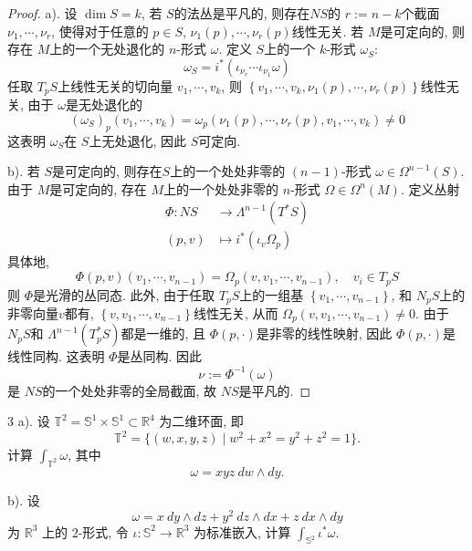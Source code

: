 \documentclass[../main.tex]{subfiles}
\begin{document}
\begin{proof}
a). 设 $\operatorname{dim}S= k$, 若 $S$的法丛是平凡的, 则存在$NS$的 $r:= n-k$个截面 $\nu _1 ,\cdots ,\nu _{r}$, 使得对于任意的 $p\in S$, $\nu _{1}\left(p\right),\cdots ,\nu _{r}\left(p\right)$线性无关.
若 $M$是可定向的, 则存在 $M$上的一个无处退化的 $n$-形式 $\omega$. 定义 $S$上的一个 $k$-形式 $\omega_{S}$:
 $$ \omega_{S}=i^{*}\left( \iota _{\nu _r } \cdots \iota _{\nu _{1}}\omega\right) $$
任取 $T_{p}S$上线性无关的切向量 $v_1,\cdots ,v_{k}$, 则 $\left\{ v_1,\cdots ,v_{k},\nu _1 \left(p\right),\cdots ,\nu _{r}\left(p\right) \right\}$线性无关, 由于 $\omega$是无处退化的
 $$ \left(\omega_{S}\right)_{p}\left(v_1,\cdots ,v_{k}\right)=\omega_{p}\left(\nu _1 \left(p\right),\cdots ,\nu _{r}\left(p\right),v_1,\cdots ,v_{k}\right)\neq 0  $$
这表明 $\omega_{S}$在 $S$上无处退化, 因此 $S$可定向.

b). 若 $S$是可定向的, 则存在$S$上的一个处处非零的 $\left(n-1\right)$-形式 $\omega\in \Omega^{n-1}\left(S\right)$. 由于 $M$是可定向的, 存在 $M$上的一个处处非零的 $n$-形式 $\Omega\in \Omega^{n}\left(M\right)$. 定义丛射
 $$ \begin{aligned} \Phi : NS&\to \Lambda^{n-1}\left(T^{*}S\right) \\ \left(p,v\right)&\mapsto  i^{*}\left(\iota _{v }\Omega_{p}\right)\end{aligned} $$
具体地,
 $$ \Phi \left(p,v \right)\left(v_1,\cdots ,v_{n-1}\right)=  \Omega_{p}\left(v,v_1,\cdots ,v_{n-1}\right),\quad v_{i}\in T_{p}S$$
则 $\Phi$是光滑的丛同态. 此外, 由于任取 $T_{p}S$上的一组基 $\left\{ v_1,\cdots ,v_{n-1} \right\}$, 和 $N_{p}S$上的非零向量$v$都有, $\left\{ v,v_1,\cdots ,v_{n-1} \right\}$线性无关, 从而 $\Omega_{p}\left(v,v_1,\cdots ,v_{n-1}\right)\neq 0$. 由于 $N_{p}S$和 $\Lambda^{n-1}\left(T^{*}_{p}S\right)$都是一维的, 且 $\Phi \left(p,\cdot \right)$是非零的线性映射, 因此 $\Phi \left(p,\cdot \right)$是线性同构. 这表明 $\Phi$是丛同构. 因此
 $$ \nu := \Phi ^{-1} \left(\omega\right) $$
是 $NS$的一个处处非零的全局截面, 故 $NS$是平凡的.
\end{proof}
\begin{exercise}{3}{}
a). 设 $\mathbb{T}^2 = \mathbb{S}^1 \times \mathbb{S}^1 \subset \mathbb{R}^4$ 为二维环面, 即
$$
\mathbb{T}^2 = \{(w, x, y, z) \mid w^2 + x^2 = y^2 + z^2 = 1\}.
$$
计算 $\int_{\mathbb{T}^2} \omega$, 其中
$$
\omega = xyz \ dw \wedge dy.
$$

b). 设
$$
\omega = x \ dy \wedge dz + y^2 \ dz \wedge dx + z \ dx \wedge dy
$$
为 $\mathbb{R}^3$ 上的 $2$-形式, 令 $\iota: \mathbb{S}^2 \to \mathbb{R}^3$ 为标准嵌入, 计算 $\int_{\mathbb{S}^2} \iota^* \omega$.
\end{exercise}
\end{document}
